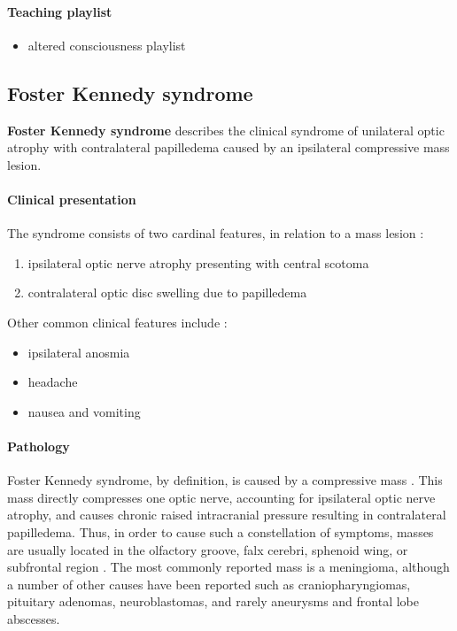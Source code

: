 \paragraph{Teaching playlist}

\begin{itemize}
	\item
	altered consciousness playlist
\end{itemize}

\subsection{Foster Kennedy syndrome}

\textbf{Foster Kennedy syndrome} describes the clinical syndrome of unilateral optic atrophy with contralateral papilledema caused by an ipsilateral compressive mass lesion.

\paragraph{Clinical presentation}

The syndrome consists of two cardinal features, in relation to a mass lesion :

\begin{enumerate}
	\item
	ipsilateral optic nerve atrophy presenting with central scotoma
	\item
	contralateral optic disc swelling due to papilledema
\end{enumerate}

Other common clinical features include :

\begin{itemize}
	\item
	ipsilateral anosmia
	\item
	headache
	\item
	nausea and vomiting
\end{itemize}

\paragraph{Pathology}

Foster Kennedy syndrome, by definition, is caused by a compressive mass . This mass directly compresses one optic nerve, accounting for ipsilateral optic nerve atrophy, and causes chronic raised intracranial pressure resulting in contralateral papilledema. Thus, in order to cause such a constellation of symptoms, masses are usually located in the olfactory groove, falx cerebri, sphenoid wing, or subfrontal region . The most commonly reported mass is a meningioma, although a number of other causes have been reported such as craniopharyngiomas, pituitary adenomas, neuroblastomas, and rarely aneurysms and frontal lobe abscesses.

